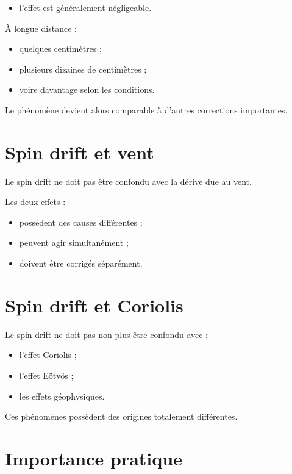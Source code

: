 \begin{itemize}
    \item l'effet est généralement négligeable.
\end{itemize}

À longue distance :

\begin{itemize}
    \item quelques centimètres ;
    \item plusieurs dizaines de centimètres ;
    \item voire davantage selon les conditions.
\end{itemize}

Le phénomène devient alors comparable à d'autres corrections importantes.

\section{Spin drift et vent}

Le spin drift ne doit pas être confondu avec la dérive due au vent.

Les deux effets :

\begin{itemize}
    \item possèdent des causes différentes ;
    \item peuvent agir simultanément ;
    \item doivent être corrigés séparément.
\end{itemize}

\section{Spin drift et Coriolis}

Le spin drift ne doit pas non plus être confondu avec :

\begin{itemize}
    \item l'effet Coriolis ;
    \item l'effet Eötvös ;
    \item les effets géophysiques.
\end{itemize}

Ces phénomènes possèdent des origines totalement différentes.

\section{Importance pratique}

